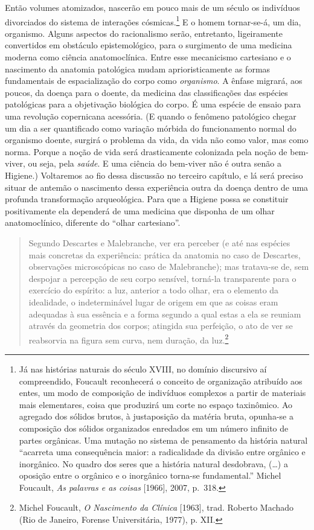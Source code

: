 Então volumes atomizados, nascerão em pouco mais de um século os
indivíduos divorciados do sistema de interações cósmicas.\footnote{Já
  nas histórias naturais do século XVIII, no domínio discursivo aí
  compreendido, Foucault reconhecerá o conceito de organização atribuído
  aos entes, um modo de composição de indivíduos complexos a partir de
  materiais mais elementares, coisa que produzirá um corte no espaço
  taxinômico. Ao agregado dos sólidos brutos, à justaposição da matéria
  bruta, opunha-se a composição dos sólidos organizados enredados em um
  número infinito de partes orgânicas. Uma mutação no sistema de
  pensamento da história natural ``acarreta uma consequência maior: a
  radicalidade da divisão entre orgânico e inorgânico. No quadro dos
  seres que a história natural desdobrava, (\ldots{}) a oposição entre o
  orgânico e o inorgânico torna-se fundamental.'' Michel Foucault,
  \emph{As palavras e as coisas} {[}1966{]}, 2007, p.~318.} E o homem
tornar-se-á, um dia, organismo. Alguns aspectos do racionalismo serão,
entretanto, ligeiramente convertidos em obstáculo epistemológico, para o
surgimento de uma medicina moderna como ciência anatomoclínica. Entre
esse mecanicismo cartesiano e o nascimento da anatomia patológica mudam
aprioristicamente as formas fundamentais de espacialização do corpo como
\emph{organismo}. A ênfase migrará, aos poucos, da doença para o doente,
da medicina das classificações das espécies patológicas para a
objetivação biológica do corpo. É uma espécie de ensaio para uma
revolução copernicana acessória. (E quando o fenômeno patológico chegar
um dia a ser quantificado como variação mórbida do funcionamento normal
do organismo doente, surgirá o problema da vida, da vida não como valor,
mas como norma. Porque a noção de vida será drasticamente colonizada
pela noção de bem-viver, ou seja, pela \emph{saúde}. E uma ciência do
bem-viver não é outra senão a Higiene.) Voltaremos ao fio dessa
discussão no terceiro capítulo, e lá será preciso situar de antemão o
nascimento dessa experiência outra da doença dentro de uma profunda
transformação arqueológica. Para que a Higiene possa se constituir
positivamente ela dependerá de uma medicina que disponha de um olhar
anatomoclínico, diferente do ``olhar cartesiano''.

\begin{quote}
Segundo Descartes e Malebranche, ver era perceber (e até nas espécies
mais concretas da experiência: prática da anatomia no caso de Descartes,
observações microscópicas no caso de Malebranche); mas tratava-se de,
sem despojar a percepção de seu corpo sensível, torná-la transparente
para o exercício do espírito: a luz, anterior a todo olhar, era o
elemento da idealidade, o indeterminável lugar de origem em que as
coisas eram adequadas à sua essência e a forma segundo a qual estas a
ela se reuniam através da geometria dos corpos; atingida sua perfeição,
o ato de ver se reabsorvia na figura sem curva, nem duração, da
luz.\footnote{Michel Foucault, \emph{O Nascimento da Clínica}
  {[}1963{]}, trad. Roberto Machado (Rio de Janeiro, Forense
  Universitária, 1977), p. XII.}
\end{quote}

